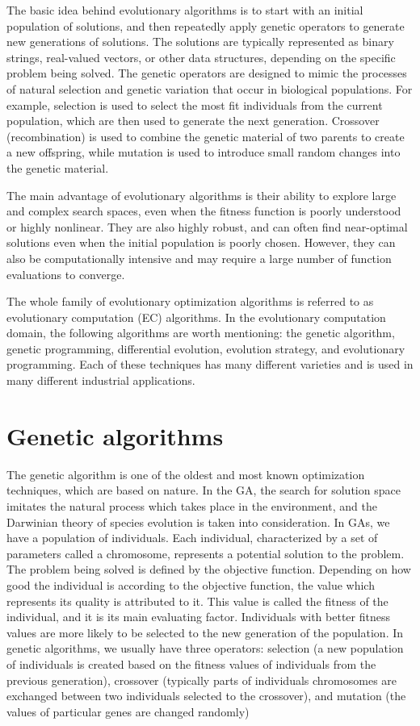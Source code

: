 \documentclass[twoside]{ctuthesis}
\theoremstyle{plain}
\theoremstyle{definition}
\theoremstyle{note}
\begin{document}
The basic idea behind evolutionary algorithms is to start with an initial population of solutions, and then repeatedly apply genetic operators to generate new generations of solutions. The solutions are typically represented as binary strings, real-valued vectors, or other data structures, depending on the specific problem being solved. The genetic operators are designed to mimic the processes of natural selection and genetic variation that occur in biological populations. For example, selection is used to select the most fit individuals from the current population, which are then used to generate the next generation. Crossover (recombination) is used to combine the genetic material of two parents to create a new offspring, while mutation is used to introduce small random changes into the genetic material.

The main advantage of evolutionary algorithms is their ability to explore large and complex search spaces, even when the fitness function is poorly understood or highly nonlinear. They are also highly robust, and can often find near-optimal solutions even when the initial population is poorly chosen. However, they can also be computationally intensive and may require a large number of function evaluations to converge.

The whole family of evolutionary optimization algorithms is referred to as evolutionary computation (EC) algorithms. In the evolutionary computation domain, the following algorithms are worth mentioning: the genetic algorithm, genetic programming, differential evolution, evolution strategy, and evolutionary programming. Each of these techniques has many different varieties and is used in many different industrial applications.

\section{Genetic algorithms}
The genetic algorithm is one of the oldest and most known optimization techniques, which are based on nature. In the GA, the search for solution space imitates the natural process which takes place in the environment, and the Darwinian theory of species evolution is taken into consideration. In GAs, we have a population of individuals. Each individual, characterized by a set of parameters called a chromosome, represents a potential solution to the problem. The problem being solved is defined by the objective function. Depending on how good the individual is according to the objective function, the value which represents its quality is attributed to it. This value is called the fitness of the individual, and it is its main evaluating factor. Individuals with better fitness values are more likely to be selected to the new generation of the population. In genetic algorithms, we usually have three operators: selection (a new population of individuals is created based on the fitness values of individuals from the previous generation), crossover (typically parts of individuals chromosomes are exchanged between two individuals selected to the crossover), and mutation (the values of particular genes are changed randomly)
\end{document}

